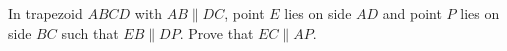 In trapezoid $ABCD$ with $AB\parallel DC$, point $E$ lies on side $AD$ and point $P$ lies on side $BC$ such that $EB\parallel DP$. Prove that $EC\parallel AP$.
